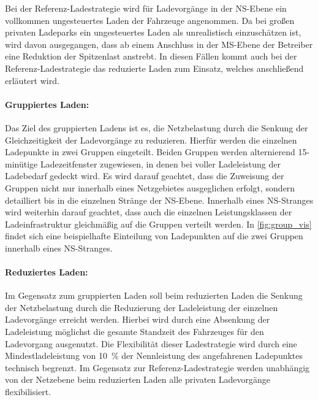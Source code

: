 Bei der Referenz-Ladestrategie wird für Ladevorgänge in der \gls{NS}-Ebene ein vollkommen ungesteuertes Laden der Fahrzeuge angenommen.
Da bei großen privaten Ladeparks ein ungesteuertes Laden als unrealistisch einzuschätzen ist, wird davon ausgegangen, dass ab einem Anschluss in der \gls{MS}-Ebene der Betreiber eine Reduktion der Spitzenlast anstrebt.
In diesen Fällen kommt auch bei der Referenz-Ladestrategie das reduzierte Laden zum Einsatz, welches anschließend erläutert wird.


\paragraph{Gruppiertes Laden:}

Das Ziel des gruppierten Ladens ist es, die Netzbelastung durch die Senkung der Gleichzeitigkeit der Ladevorgänge zu reduzieren.
Hierfür werden die einzelnen Ladepunkte in zwei Gruppen eingeteilt.
Beiden Gruppen werden alternierend 15-minütige Ladezeitfenster zugewiesen, in denen bei voller Ladeleistung der Ladebedarf gedeckt wird.
Es wird darauf geachtet, dass die Zuweisung der Gruppen nicht nur innerhalb eines Netzgebietes ausgeglichen erfolgt, sondern detailliert bis in die einzelnen Stränge der \gls{NS}-Ebene.
Innerhalb eines \gls{NS}-Stranges wird weiterhin darauf geachtet, dass auch die einzelnen Leistungsklassen der Ladeinfrastruktur gleichmäßig auf die Gruppen verteilt werden.
In \autoref{fig:group_vis} findet sich eine beispielhafte Einteilung von Ladepunkten auf die zwei Gruppen innerhalb eines \gls{NS}-Stranges.




\paragraph{Reduziertes Laden:}

Im Gegensatz zum gruppierten Laden soll beim reduzierten Laden die Senkung der Netzbelastung durch die Reduzierung der Ladeleistung der einzelnen Ladevorgänge erreicht werden.
Hierbei wird durch eine Absenkung der Ladeleistung möglichst die gesamte Standzeit des Fahrzeuges für den Ladevorgang ausgenutzt.
Die Flexibilität dieser Ladestrategie wird durch eine Mindestladeleistung von \SI{10}{\percent} der Nennleistung des angefahrenen Ladepunktes technisch begrenzt.
Im Gegensatz zur Referenz-Ladestrategie werden unabhängig von der Netzebene beim reduzierten Laden alle privaten Ladevorgänge flexibilisiert.

